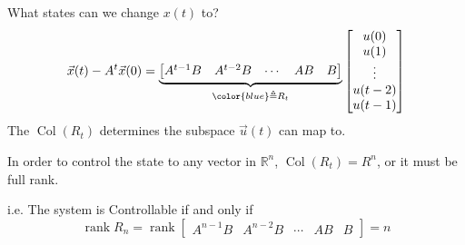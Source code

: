 \begin{frame}{What states can we change \(x(t)\) to?}
    \[
        \vec x(t) - A^t \vec x(0) =
        \underbrace{\begin{bmatrix}
            A^{t - 1} B & A^{t -2} B & \cdots & AB & B
        \end{bmatrix}}_{\color{blue}\triangleq R_t}
        \begin{bmatrix}
            u(0) \\
            u(1) \\
            \vdots \\
            u(t -2) \\
            u(t -1) \\
        \end{bmatrix}
    \]
    \providecommand{\Col}{\operatorname{Col}}
    \providecommand{\rank}{\operatorname{rank}}
    The \(\Col(R_t)\) determines the subspace \(\vec u(t)\) can map to.

    In order to control the state to any vector in \(\mathbb R^n\), \(\Col(R_t) = R^n\), or it must be full rank.

    i.e. The system is Controllable if and only if
    \[
        \rank{R_n} = \rank\begin{bmatrix}
            A^{n - 1} B & A^{n -2} B & \cdots & AB & B
        \end{bmatrix} = n
    \]

\end{frame}
